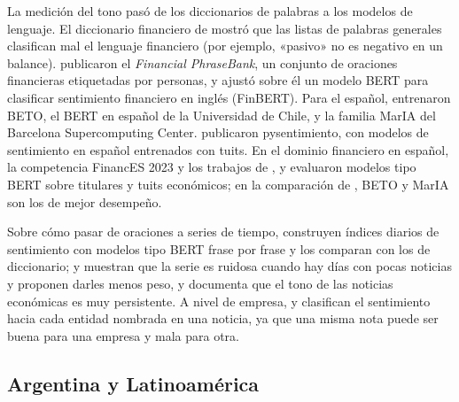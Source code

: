 La medición del tono pasó de los diccionarios de palabras a los modelos de lenguaje. El
diccionario financiero de \citet{loughran2011} mostró que las listas de palabras generales
clasifican mal el lenguaje financiero (por ejemplo, «pasivo» no es negativo en un balance).
\citet{malo2014phrasebank} publicaron el \textit{Financial PhraseBank}, un conjunto de
oraciones financieras etiquetadas por personas, y \citet{araci2019finbert} ajustó sobre él un
modelo BERT \citep{devlin2019bert} para clasificar sentimiento financiero en inglés
(FinBERT). Para el español, \citet{canete2020beto} entrenaron BETO, el BERT en español de la
Universidad de Chile, y \citet{gutierrez2022maria} la familia MarIA del Barcelona
Supercomputing Center. \citet{perez2021pysentimiento} publicaron pysentimiento, con modelos de
sentimiento en español entrenados con tuits. En el dominio financiero en español, la
competencia FinancES 2023 \citep{marin2023finances} y los trabajos de \citet{pan2023peerj},
\citet{garciadiaz2023ieee} y \citet{rodriguezgarcia2023} evaluaron modelos tipo BERT sobre
titulares y tuits económicos; en la comparación de \citet{pan2023peerj}, BETO y MarIA son los
de mejor desempeño.

Sobre cómo pasar de oraciones a series de tiempo, \citet{mavillonio2026} construyen índices
diarios de sentimiento con modelos tipo BERT frase por frase y los comparan con los de
diccionario; \citet{stan2026} y \citet{carbo2026} muestran que la serie es ruidosa cuando hay
días con pocas noticias y proponen darles menos peso, y \citet{correarocha2026} documenta que
el tono de las noticias económicas es muy persistente. A nivel de empresa,
\citet{tang2023finentity} y \citet{sinha2023sentfin} clasifican el sentimiento hacia cada
entidad nombrada en una noticia, ya que una misma nota puede ser buena para una empresa y mala
para otra.

\subsection{Argentina y Latinoamérica}


